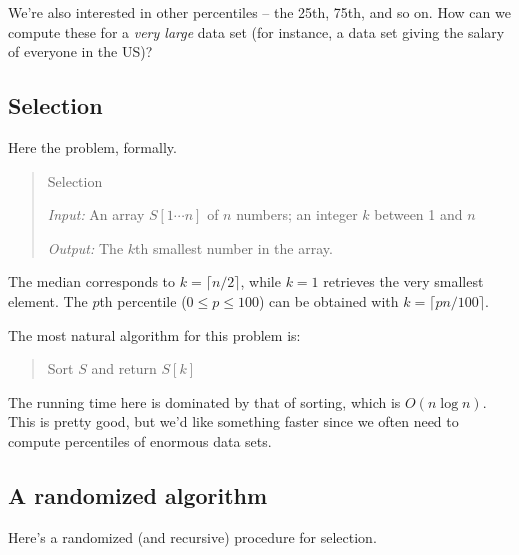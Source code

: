 \documentclass{report}
\theoremstyle{plain}
\theoremstyle{definition}
\begin{document}
We're also interested in other percentiles -- the 25th, 75th, and so on. How can
we compute these for a {\it very large} data set (for instance, a data set giving 
the salary of everyone in the US)?

\subsection{Selection}

Here the problem, formally.

\begin{quote}
{\sc Selection}

{\it Input:} An array $S[1\cdots n]$ of $n$ numbers; an integer $k$ between 1 and $n$

{\it Output:} The $k$th smallest number in the array.
\end{quote}
The median corresponds to $k= \lceil n/2 \rceil$, while $k=1$ retrieves the very 
smallest element. The $p$th percentile ($0 \leq p \leq 100$) can be obtained with 
$k = \lceil pn/100 \rceil$.

The most natural algorithm for this problem is:
\begin{quote}
Sort $S$ and return $S[k]$
\end{quote}
The running time here is dominated by that of sorting, which is $O(n \log n)$. This
is pretty good, but we'd like something faster since we often need to compute
percentiles of enormous data sets.

\subsection{A randomized algorithm}

Here's a randomized (and recursive) procedure for selection.
\end{document}
